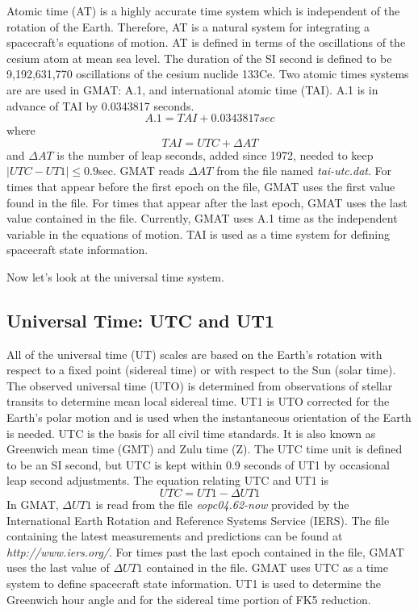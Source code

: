 Atomic time (AT) is a highly accurate time system which is
independent of the rotation of the Earth\cite{vallado2}.
Therefore, AT is a natural system for integrating a spacecraft's
equations of motion.  AT is defined in terms of the oscillations
of the cesium atom at mean sea level. The duration of the SI
second is defined to be 9,192,631,770 oscillations of the cesium
nuclide 133Ce. Two atomic times systems are are used in GMAT: A.1,
and international atomic time (TAI). A.1 is in advance of TAI by
0.0343817 seconds.
%
\begin{equation}
     A.1 = TAI + 0.0343817 sec
\end{equation}
%
where
%
\begin{equation}
   TAI = UTC + \Delta AT
\end{equation}
%
and $\Delta AT$ is the number of leap seconds, added since 1972,
needed to keep $\mid UTC - UT1 \mid \leq 0.9 $sec.  GMAT reads
$\Delta AT$ from the file named \emph{tai-utc.dat}. For times that
appear before the first epoch on the file, GMAT uses the first value
found in the file.  For times that appear after the last epoch, GMAT
uses the last value contained in the file.  Currently, GMAT uses A.1
time as the independent variable in the equations of motion. TAI is
used as a time system for defining spacecraft state information.

Now let's look at the universal time system.


\subsection{Universal Time: UTC and UT1}
 \label{Sec:UniversalTime}

All of the universal time (UT) scales are based on the Earth's
rotation with respect to a fixed point (sidereal time) or with
respect to the Sun (solar time). The observed universal time (UTO)
is determined from observations of stellar transits to determine
mean local sidereal time. UT1 is UTO corrected for the Earth's polar
motion and is used when the instantaneous orientation of the Earth
is needed.  UTC is the basis for all civil time standards. It is
also known as Greenwich mean time (GMT) and Zulu time (Z). The UTC
time unit is defined to be an SI second, but UTC is kept within 0.9
seconds of UT1 by occasional leap second adjustments.  The equation
relating UTC and UT1 is
%
\begin{equation}
    UTC = UT1 - \Delta UT1 \label{Eq:UT1ToUTC}
\end{equation}
%
In GMAT,  $\Delta UT1$ is read from the file \emph{eopc04.62-now}
provided by the International Earth Rotation and Reference Systems
Service (IERS). The file containing the latest measurements and
predictions can be found at
\\\emph{http://www.iers.org/}. For times past the last epoch
contained in the file, GMAT uses the last value of $ \Delta UT1$
contained in the file. GMAT uses UTC as a time system to define
spacecraft state information. UT1 is used to determine the Greenwich
hour angle and for the sidereal time portion of FK5 reduction.

